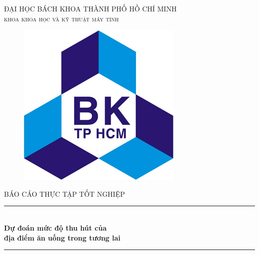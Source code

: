 \documentclass[12pt]{extarticle}
\begin{document}
\begin{titlepage}

\newcommand{\HRule}{\rule{\linewidth}{0.5mm}} %

\center %
 
\begin{flushright}
\end{flushright}
\textsc{\large ĐẠI HỌC BÁCH KHOA THÀNH PHỐ HỒ CHÍ MINH}\\[0.2cm] %
\textsc{\Large \scshape khoa khoa học và kỹ thuật máy tính}\\[0.5cm] %
\begin{figure}[H] 
\centering
\includegraphics[scale=1.6]{images/logo.jpg}
\end{figure} 

\textsc{\large BÁO CÁO THỰC TẬP TỐT NGHIỆP}\\[0.2cm] %

\HRule \\[0.4cm]
{ \huge \bfseries Dự đoán mức độ thu hút của\\địa điểm ăn uống trong tương lai}\\[0.4cm] %
\HRule \\[0.8cm]


\end{titlepage}
\end{document}
